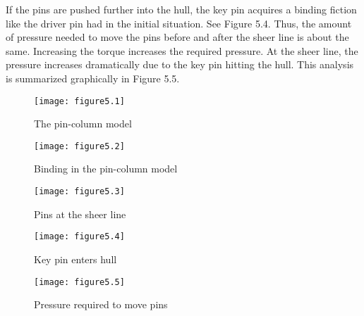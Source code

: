 If the pins are pushed further into the hull, the key pin acquires a binding fiction like the driver pin had in the initial situation.
See Figure 5.4.
Thus, the amount of pressure needed to move the pins before and after the sheer line is about the same.
Increasing the torque increases the required pressure.
At the sheer line, the pressure increases dramatically due to the key pin hitting the hull.
This analysis is summarized graphically in Figure 5.5.

\begin{figure}
    \texttt{[image: figure5.1]}
    \caption{The pin-column model}
\end{figure}

\begin{figure}
    \texttt{[image: figure5.2]}
    \caption{Binding in the pin-column model}
\end{figure}

\begin{figure}
    \texttt{[image: figure5.3]}
    \caption{Pins at the sheer line}
\end{figure}

\begin{figure}
    \texttt{[image: figure5.4]}
    \caption{Key pin enters hull}
\end{figure}

\begin{figure}
    \texttt{[image: figure5.5]}
    \caption{Pressure required to move pins}
\end{figure}
